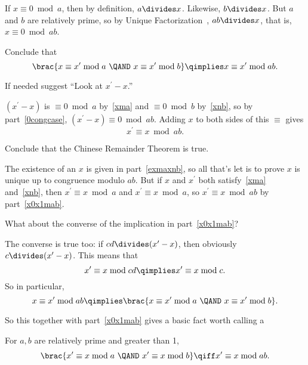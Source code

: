 \begin{problem}
\begin{solution}
  If $x \equiv 0 \bmod a$, then by definition, $a \divides x$.  Likewise,
  $b \divides x$.  But $a$ and $b$ are relatively prime, so by Unique
  Factorization~, $ab \divides x$, that is, $x
  \equiv 0 \bmod {ab}$.
\end{solution}

\ppart\label{x0x1mab} Conclude that
\[
\brac{x \equiv x^\prime \bmod{a}\ \QAND\ x \equiv x^\prime \bmod b} \qimplies
x \equiv x^\prime \bmod{ab}.
\]

\begin{staffnotes}
If needed suggest ``Look at $x^\prime - x$.''
\end{staffnotes}
\begin{solution}

$(x^\prime - x)$ is $\equiv 0 \bmod a$ by~\eqref{xma} and $\equiv 0 \bmod
  b$ by~\eqref{xnb}, so by part~\eqref{0congcase}, $(x^\prime-x) \equiv 0
  \bmod{ab}$.  Adding $x$ to both sides of this $\equiv$ gives
\[
x^\prime \equiv x \bmod{ab}.
\]
\end{solution}

\ppart Conclude that the Chinese Remainder Theorem is true.
\begin{solution}
  The existence of an $x$ is given in part~\eqref{exmaxnb}, so all that's
  let is to prove $x$ is unique up to congruence modulo $ab$.  But if $x$
  and $x^\prime$ both satisfy~\eqref{xma} and~\eqref{xnb}, then $x^\prime
  \equiv x \bmod {a}$ and $x^\prime \equiv x \bmod {a}$, so $x^\prime
  \equiv x \bmod{ab}$ by part~\eqref{x0x1mab}.
\end{solution}

\ppart\label{xempab} What about the converse of the implication in part~\eqref{x0x1mab}?

\begin{solution}
The converse is true too: if $cd \divides (x^\prime - x)$, then obviously
$c \divides (x^\prime - x)$.  This means that
\[
x^\prime \equiv x \bmod{cd} \qimplies x^\prime \equiv x \bmod{c}.
\]
So in particular,
\[
x \equiv x^\prime \bmod{ab} \qimplies \brac{x \equiv x^\prime \bmod a
  \ \QAND\ x \equiv x^\prime \bmod b}.
\]

So this together with part~\eqref{x0x1mab} gives a basic fact worth calling
a
\begin{lemma*}
For $a, b$ are relatively prime and greater than 1,
\[
\brac{x^\prime \equiv x \bmod{a} \ \QAND\  x^\prime \equiv x \bmod{b}}
\qiff x^\prime \equiv x \bmod{ab}.
\]
\end{lemma*}
\end{solution}



\end{problem}
